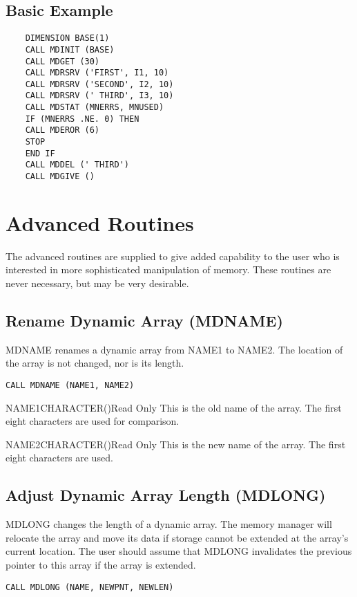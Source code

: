 \subsection{Basic Example}
\begin{verbatim}
    DIMENSION BASE(1)
    CALL MDINIT (BASE)
    CALL MDGET (30)
    CALL MDRSRV ('FIRST', I1, 10)
    CALL MDRSRV ('SECOND', I2, 10)
    CALL MDRSRV (' THIRD', I3, 10)
    CALL MDSTAT (MNERRS, MNUSED)
    IF (MNERRS .NE. 0) THEN
    CALL MDEROR (6)
    STOP
    END IF
    CALL MDDEL (' THIRD')
    CALL MDGIVE ()
\end{verbatim}

\section{Advanced Routines}
The advanced routines are supplied to give added capability to the user who
is interested in more sophisticated manipulation of memory.  These routines
are never necessary, but may be very desirable.

\subsection{Rename Dynamic Array (MDNAME)}
MDNAME renames a dynamic array from NAME1 to NAME2.  The location of the
array is not changed, nor is its length.

\verb+CALL MDNAME (NAME1, NAME2)+

\begin{argy}{NAME1}{CHARACTER\last(\last)}{Read Only}
This is the old name of the array.  The first eight characters are used for
comparison.
\end{argy}

\begin{argy}{NAME2}{CHARACTER\last(\last)}{Read Only}
This is the new name of the array.  The first eight characters are used.
\end{argy}

\subsection{Adjust Dynamic Array Length (MDLONG)}
MDLONG changes the length of a dynamic array.  The memory manager will
relocate the array and move its data if storage cannot be extended at the
array's current location.  The user should assume that MDLONG invalidates
the previous pointer to this array if the array is extended.

\verb+CALL MDLONG (NAME, NEWPNT, NEWLEN)+

